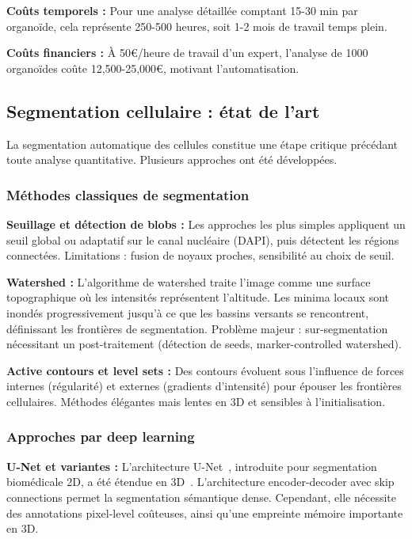 \textbf{Coûts temporels :}
Pour une analyse détaillée comptant 15-30 min par organoïde, cela représente 250-500 heures, soit 1-2 mois de travail temps plein.

\textbf{Coûts financiers :}
À 50€/heure de travail d'un expert, l'analyse de 1000 organoïdes coûte 12,500-25,000€, motivant l'automatisation.

\subsection{Segmentation cellulaire : état de l'art}

La segmentation automatique des cellules constitue une étape critique précédant toute analyse quantitative. Plusieurs approches ont été développées.

\subsubsection{Méthodes classiques de segmentation}

\textbf{Seuillage et détection de blobs :}
Les approches les plus simples appliquent un seuil global ou adaptatif sur le canal nucléaire (DAPI), puis détectent les régions connectées. Limitations : fusion de noyaux proches, sensibilité au choix de seuil.

\textbf{Watershed :}
L'algorithme de watershed traite l'image comme une surface topographique où les intensités représentent l'altitude. Les minima locaux sont inondés progressivement jusqu'à ce que les bassins versants se rencontrent, définissant les frontières de segmentation. Problème majeur : sur-segmentation nécessitant un post-traitement (détection de seeds, marker-controlled watershed).

\textbf{Active contours et level sets :}
Des contours évoluent sous l'influence de forces internes (régularité) et externes (gradients d'intensité) pour épouser les frontières cellulaires. Méthodes élégantes mais lentes en 3D et sensibles à l'initialisation.

\subsubsection{Approches par deep learning}

\textbf{U-Net et variantes :}
L'architecture U-Net~\cite{Ronneberger2015}, introduite pour segmentation biomédicale 2D, a été étendue en 3D~\cite{Cicek2016}. L'architecture encoder-decoder avec skip connections permet la segmentation sémantique dense. Cependant, elle nécessite des annotations pixel-level coûteuses, ainsi qu'une empreinte mémoire importante en 3D.

